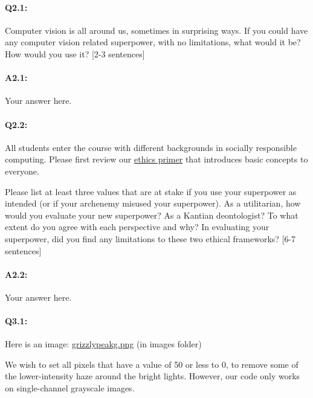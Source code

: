 \documentclass[11pt]{article}
\begin{document}

\pagebreak

\paragraph{Q2.1:} Computer vision is all around us, sometimes in surprising ways. If you could have any computer vision related superpower, with no limitations, what would it be? How would you use it? [2-3 sentences]

\paragraph{A2.1:} Your answer here.


\paragraph{Q2.2:} All students enter the course with different backgrounds in socially responsible computing. Please first review our \href{https://browncsci1430.github.io/webpage/resources/ethics_guide/}{ethics primer} that introduces basic concepts to everyone.

Please list at least three values that are at stake if you use your superpower as intended (or if your archenemy misused your superpower). As a utilitarian, how would you evaluate your new superpower? As a Kantian deontologist? To what extent do you agree with each perspective and why? In evaluating your superpower, did you find any limitations to these two ethical frameworks? [6-7 sentences]

\paragraph{A2.2:} Your answer here.



\pagebreak
\paragraph{Q3.1:} Here is an image: \href{run:images/grizzlypeakg.png}{grizzlypeakg.png} (in images folder)

We wish to set all pixels that have a value of 50 or less to 0, to remove some of the lower-intensity haze around the bright lights. However, our code only works on single-channel grayscale images.
\end{document}
